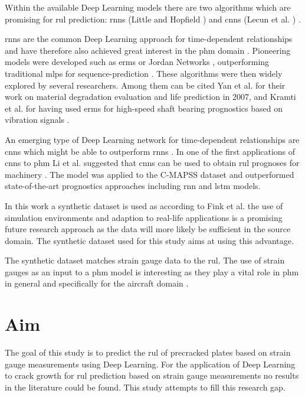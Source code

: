 \documentclass[conference]{IEEEtran}
\begin{document}
Within the available Deep Learning models there are two algorithms which are promising for \gls{rul} prediction: \glspl{rnn} (Little \cite{Little1996} and Hopfield  \cite{Hopfield1982}) and \glspl{cnn} (Lecun et al. \cite{Lecun1998}) \cite{Akrim2021}.

\glspl{rnn} are the common Deep Learning approach for time-dependent relationships and have therefore also achieved great interest in the \gls{phm} domain \cite{Akrim2021}. Pioneering models were developed such as \glspl{erm} \cite{Elman1990} or Jordan Networks \cite{Jordan1997}, outperforming traditional \glspl{mlp} for sequence-prediction \cite{Akrim2021}. These algorithms were then widely explored by several researchers. Among them can be cited Yan et al. \cite{Yan2007} for their work on material degradation evaluation and life prediction in 2007, and Kramti et al. \cite{Kramti2018} for having used \glspl{erm} for high-speed shaft bearing prognostics based on vibration signals \cite{Akrim2021}.

An emerging type of Deep Learning network for time-dependent relationships are \glspl{cnn} which might be able to outperform \glspl{rnn} \cite{Bai2018}. In one of the first applications of \glspl{cnn} to \gls{phm} Li et al. suggested that \glspl{cnn} can be used to obtain \gls{rul} prognoses for machinery \cite{Li2018}. The model was applied to the C-MAPSS dataset \cite{Saxena2008} and outperformed state-of-the-art prognostics approaches including \gls{rnn} and \gls{lstm} models.

In this work a synthetic dataset is used as according to Fink et al. \cite{Fink2020} the use of simulation environments and adaption to real-life applications is a promising future research approach as the data will more likely be sufficient in the source domain. The synthetic dataset used for this study aims at using this advantage.

The synthetic dataset matches strain gauge data to the \gls{rul}. The use of strain gauges as an input to a \gls{phm} model is interesting as they play a vital role in \gls{phm} in general \cite{Tinga2019} and specifically for the aircraft domain \cite{Timothy2009}.

\section{Aim}
\label{sec:aim}

The goal of this study is to predict the \gls{rul} of precracked plates based on strain gauge measurements using Deep Learning. 
For the application of Deep Learning to crack growth for \gls{rul} prediction based on strain gauge measurements no results in the literature could be found. This study attempts to fill this research gap.
\end{document}
